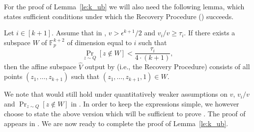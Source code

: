 For the proof of Lemma~\ref{le:k_ub} we will also need the following lemma, which states sufficient conditions under which the Recovery Procedure () succeeds.
\begin{lem}\label{le:recovery}
	Let $i \in [k+1]$. Assume that in , $v > \epsilon^{k+1}/2$ and $v_i/v \geq \tau_i$. If there exists a subspace $W$ of $\mathbb{F}_p^{k+2}$ of dimension equal to $i$ such that
	\begin{equation}\label{eq:lemma_W_assumption}
	\Pr_{z \sim Q}[z \notin W] < \frac{\tau_i} {4 \cdot (k+1)},
	\end{equation}
	then the affine subspace $\widehat{V}$ output by  (i.e., the Recovery Procedure) consists of all points $(z_1,\dots,z_{k+1})$ such that $(z_1,\dots,z_{k+1},1) \in W$.
\end{lem}

We note that  would still hold under quantitatively weaker assumptions on $v$, $v_i/v$ and $\Pr_{z \sim Q}[z \notin W]$ in . In order to keep the expressions simple, we however choose to state the above version which will be sufficient to prove . The proof of  appears in . We are now ready to complete the proof of Lemma~\ref{le:k_ub}.


